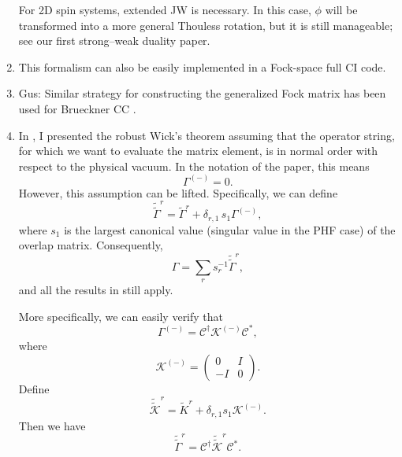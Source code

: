 \documentclass[11pt,letterpaper]{article}
\begin{document}
\begin{enumerate}
    For 2D spin systems, extended JW is necessary. In this case, $\phi$ will be transformed
    into a more general Thouless rotation, but it is still manageable; see our
    first strong--weak duality paper.
  \item This formalism can also be easily implemented in a Fock-space full CI code.
  \item Gus: Similar strategy for constructing the generalized Fock matrix
    has been used for Brueckner CC \cite{Gus1994Brueckner, Gus1995Brueckner}.
  \item In \cite{robustwick}, I presented the robust Wick's theorem assuming that
    the operator string, for which
    we want to evaluate the matrix element, is in normal order with respect to the physical vacuum.
    In the notation of the paper, this means
    \begin{equation}
      \Gamma^{(-)} = 0.
    \end{equation}
    However, this assumption can be lifted. Specifically, we can define
    \begin{equation}
      \label{eq:refactorize}
      \tilde{\tilde{\Gamma}}^r
      = \tilde{\Gamma}^r + \delta_{r,1}\, s_1 \Gamma^{(-)},
    \end{equation}
    where $s_1$ is the largest canonical value (singular value in the PHF case) of the overlap matrix.
    Consequently,
    \begin{equation}
      \Gamma = \sum_r s_r^{-1} \tilde{\tilde{\Gamma}}^r,
    \end{equation}
    and all the results in \cite{robustwick} still apply.

    More specifically, we can easily verify that
    \begin{equation}
      \Gamma^{(-)} = \mathcal{C}^\dag \mathcal{K}^{(-)} \mathcal{C}^*,
    \end{equation}
    where
    \begin{equation}
      \mathcal{K}^{(-)}
      = \begin{pmatrix}
        0 & I\\
        -I & 0
      \end{pmatrix}.
    \end{equation}
    Define
    \begin{equation}
      \tilde{\tilde{\mathcal{K}}}^r
      = \tilde{K}^r + \delta_{r, 1} s_1 \mathcal{K}^{(-)}.
    \end{equation}
    Then we have
    \begin{equation}
      \tilde{\tilde{\Gamma}}^r
      = \mathcal{C}^\dag \tilde{\tilde{\mathcal{K}}}^r \mathcal{C}^*.
    \end{equation}
  

\end{enumerate}
\end{document}
